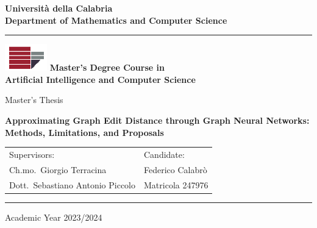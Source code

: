 \documentclass[a4paper,12pt]{report}
\begin{document}
\begin{titlepage}
\begin{center}
\textbf{\LARGE Università della Calabria}\\
\textbf{Department of Mathematics and Computer Science}\\
\vskip 6pt
\hrule
\vskip 8pt
\includegraphics{Images/unical-logo.png}
\vskip 8pt
\textbf{Master's Degree Course in \\ Artificial Intelligence and Computer Science}

\vskip 32pt
Master's Thesis

\vskip 32pt
{ \huge \bfseries Approximating Graph Edit Distance through Graph Neural Networks: Methods, Limitations, and Proposals}\\[0.4cm]
\vskip 100pt

\begin{tabular}{p{8cm}p{8cm}}
Supervisors: & Candidate:\\
Ch.mo.~Giorgio Terracina & Federico Calabrò \\
Dott.~Sebastiano Antonio Piccolo & Matricola 247976\\
\end{tabular}

\vskip 100pt
\hrule
\vskip 6pt
Academic Year 2023/2024
\vfill
\end{center}

\end{titlepage}
\end{document}
